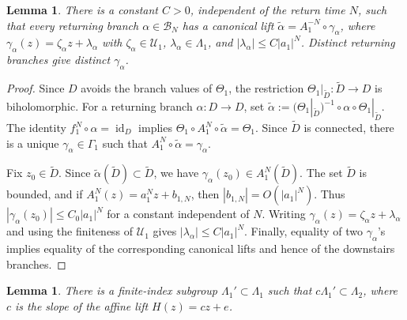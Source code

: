 \documentclass[11pt]{amsart}
\numberwithin{equation}{section}
\theoremstyle{plain}
\newtheorem{lem}[thm]{Lemma}
\theoremstyle{definition}
\theoremstyle{remark}
\begin{document}
\begin{lem}\label{lem:lattes-return-parameter-bound}
There is a constant $C>0$, independent of the return time $N$, such
that every returning branch $\alpha\in\mathscr B_N$ has a canonical
lift $\widetilde\alpha=A_1^{-N}\circ\gamma_\alpha$, where
$\gamma_\alpha(z)=\zeta_\alpha z+\lambda_\alpha$ with
$\zeta_\alpha\in\mathcal U_1$,
$\lambda_\alpha\in\Lambda_1$, and
$|\lambda_\alpha|\leq C|a_1|^N$. Distinct returning branches give
distinct $\gamma_\alpha$.
\end{lem}

\begin{proof}
Since $D$ avoids the branch values of $\Theta_1$, the restriction
$\Theta_1|_{\widetilde D}\colon\widetilde D\to D$ is biholomorphic.
For a returning branch $\alpha\colon D\to D$, set
$\widetilde\alpha:=(\Theta_1|_{\widetilde D})^{-1}\circ
\alpha\circ\Theta_1|_{\widetilde D}$.
The identity $f_1^N\circ\alpha=\operatorname{id}_D$ implies
$\Theta_1\circ A_1^N\circ\widetilde\alpha=\Theta_1$. Since
$\widetilde D$ is connected, there is a unique
$\gamma_\alpha\in\Gamma_1$ such that
$A_1^N\circ\widetilde\alpha=\gamma_\alpha$.

Fix $z_0\in\widetilde D$. Since
$\widetilde\alpha(\widetilde D)\subset\widetilde D$, we have
$\gamma_\alpha(z_0)\in A_1^N(\widetilde D)$. The set
$\widetilde D$ is bounded, and if
$A_1^N(z)=a_1^Nz+b_{1,N}$, then
$|b_{1,N}|=O(|a_1|^N)$. Thus
$|\gamma_\alpha(z_0)|\leq C_0|a_1|^N$ for a constant independent of
$N$. Writing
$\gamma_\alpha(z)=\zeta_\alpha z+\lambda_\alpha$ and using the
finiteness of $\mathcal U_1$ gives
$|\lambda_\alpha|\leq C|a_1|^N$. Finally, equality of two
$\gamma_\alpha$'s
implies equality of the corresponding canonical
lifts and hence of the downstairs branches.
\end{proof}

\begin{lem}\label{lem:lattes-original-slope}
There is a finite-index subgroup $\Lambda_1'\subset\Lambda_1$ such
that $c\Lambda_1'\subset\Lambda_2$, where $c$ is the slope of the
affine lift $H(z)=cz+e$.
\end{lem}
\end{document}
